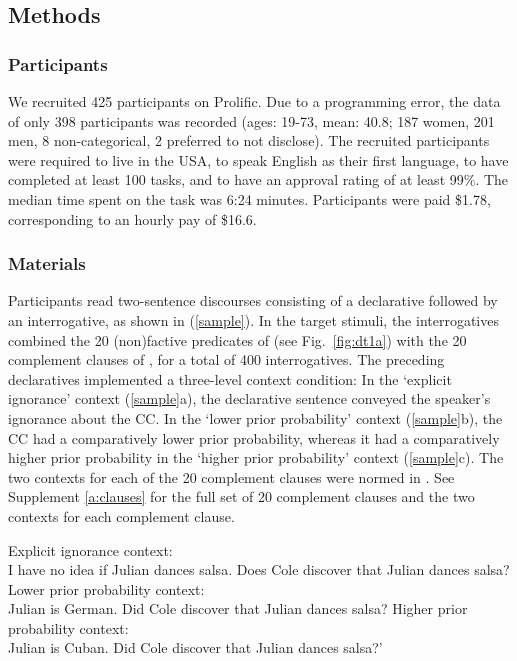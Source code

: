 \documentclass[11pt,fleqn]{article}
\newcommand{\6}{\mbox{$[\hspace*{-.6mm}[$}}
\newcommand{\9}{\mbox{$]\hspace*{-.6mm}]$}}
\begin{document}
\subsection{Methods}\label{s-methods}

\subsubsection{Participants}

We recruited 425 participants on Prolific. Due to a programming error, the data of only 398 participants was recorded (ages: 19-73, mean: 40.8; 187 women, 201 men, 8 non-categorical, 2 preferred to not disclose). The recruited participants were required to live in the USA, to speak English as their first language, to have completed at least 100 tasks, and to have an approval rating of at least 99\%. The median time spent on the task was 6:24 minutes. Participants were paid \$1.78, corresponding to an hourly pay of \$16.6.


\subsubsection{Materials}

Participants read two-sentence discourses consisting of a declarative followed by an interrogative, as shown in (\ref{sample}). In the target stimuli, the interrogatives combined the 20 (non)factive predicates of \citealt{degen-tonhauser-language} (see Fig.~\ref{fig:dt1a}) with the 20 complement clauses of \citealt{degen-tonhauser-language}, for a total of 400 interrogatives. The preceding declaratives implemented a three-level context condition: In the `explicit ignorance' context (\ref{sample}a), the declarative sentence conveyed the speaker's ignorance about the CC. In the `lower prior probability' context (\ref{sample}b), the CC had a comparatively lower prior probability, whereas it had a comparatively higher prior probability in the `higher prior probability' context (\ref{sample}c). The two contexts for each of the 20 complement clauses were normed in \citealt{degen-tonhauser-openmind}. See Supplement \ref{a:clauses} for the full set of 20 complement clauses and the two contexts for each complement clause.

\begin{exe}
\ex\label{sample}
\begin{xlist}
\ex Explicit ignorance context: \\ I have no idea if Julian dances salsa. Does Cole discover that Julian dances salsa?
\ex Lower prior probability context: \\ Julian is German. Did Cole discover that Julian dances salsa?
\ex Higher prior probability context: \\ Julian is Cuban. Did Cole discover that Julian dances salsa?'
\end{xlist}
\end{exe}
\end{document}
